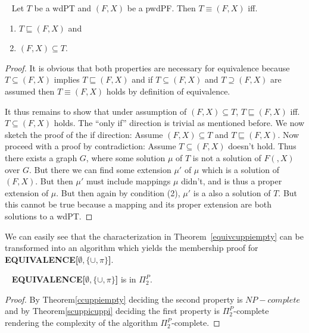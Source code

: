 \begin{theorem}~\cite{pichler2014containment}\label{equivcuppiempty}
Let $T$ be a wdPT and $(F,X)$ be a pwdPF.
Then $T \equiv (F,X)$ iff.
\begin{enumerate}
\item $T \sqsubseteq (F,X)$ and
\item $(F,X) \subseteq T$.
\end{enumerate}
\end{theorem}
\begin{proof}
It is obvious that both properties are necessary for equivalence because 
$T \subseteq (F,X)$ implies $T \sqsubseteq (F,X)$ and if  $T \subseteq (F,X)$
and
$T \supseteq (F,X)$ are assumed then $T \equiv (F,X)$ holds by definition of equivalence.

It thus remains to show that  under assumption of 
$(F,X) \subseteq T$, $T \sqsubseteq (F,X)$ iff. $T \subseteq (F,X)$  holds. 
The ``only if'' direction is trivial as mentioned before.
We now sketch the proof of the if direction:
Assume  $(F,X) \subseteq T$ and $T \sqsubseteq (F,X)$.
Now proceed with a proof by contradiction: Assume $T \subseteq (F,X)$ doesn't
hold. Thus there exists a graph $G$, where some solution $\mu$ of $T$ is not a
solution of $F(,X)$ over $G$. But there we can find some extension $\mu'$ of
$\mu$ which is a solution of $(F,X)$. But then $\mu'$ must include mappings
$\mu$ didn't, and is thus a proper extension of $\mu$. But then again by
condition (2), $\mu'$ is a also a solution of $T$. But this cannot be true
because a mapping and its proper extension are both solutions to a wdPT. 
\end{proof}
We can easily see that the characterization in Theorem~\ref{equivcuppiempty} can be
transformed into an algorithm which yields the membership proof for
\textbf{EQUIVALENCE[$\emptyset,\{\cup,\pi\}$]}.
\begin{theorem}~\cite{pichler2014containment}
	\textbf{EQUIVALENCE[$\emptyset,\{\cup,\pi\}$]} is in $\Pi_2^P$.
\end{theorem}
\begin{proof}
By Theorem\ref{ccuppiempty} deciding the second property is $NP-complete$ and
by Theorem\ref{scuppicuppi} deciding the first property is $\Pi_2^P$-complete
rendering the complexity of the algorithm $\Pi_2^P$-complete.
\end{proof}

